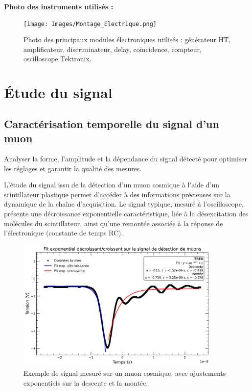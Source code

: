 \documentclass[a4paper,12pt,twoside]{article}
\begin{document}
\vspace{1em}
\noindent
\textbf{Photo des instruments utilisés :}

\begin{figure}[H]
  \centering
  \texttt{[image: Images/Montage\_Electrique.png]}
  \caption{Photo des principaux modules électroniques utilisés : générateur HT, amplificateur, discriminateur, delay, coïncidence, compteur, oscilloscope Tektronix.}
  \label{fig:photo_instruments}
\end{figure}

\newpage

\section{Étude du signal}

\subsection{Caractérisation temporelle du signal d’un muon}


\vspace{1em}
\begin{center}
\begin{tcolorbox}[colback=blue!5!white, colframe=blue!60!black, title=Principe de l’étude du signal]
Analyser la forme, l’amplitude et la dépendance du signal détecté pour optimiser les réglages et garantir la qualité des mesures.
\end{tcolorbox}
\end{center}


L’étude du signal issu de la détection d’un muon cosmique à l’aide d’un scintillateur plastique permet d’accéder à des informations précieuses sur la dynamique de la chaîne d’acquisition. Le signal typique, mesuré à l’oscilloscope, présente une décroissance exponentielle caractéristique, liée à la désexcitation des molécules du scintillateur, ainsi qu’une remontée associée à la réponse de l’électronique (constante de temps RC).

\begin{figure}[h!]
    \centering
    \includegraphics[width=0.9\textwidth]{Images/Desexitation_Scintillateur_2.png}
    \caption{Exemple de signal mesuré sur un muon cosmique, avec ajustements exponentiels sur la descente et la montée.}
    \label{fig:signal-muon}
\end{figure}
\end{document}
